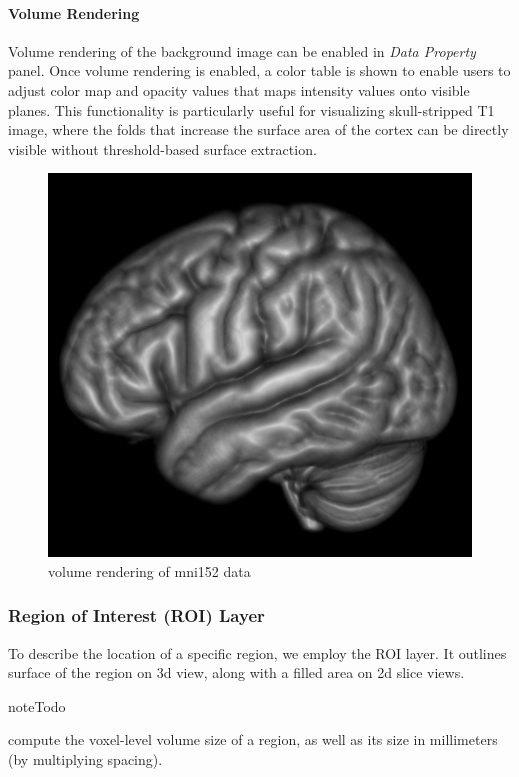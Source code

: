 \documentclass[letterpaper,10pt,english]{sphinxmanual}
\begin{document}
\paragraph{Volume Rendering}
\label{visualization:volume-rendering}
Volume rendering of the background image can be enabled in \emph{Data Property} panel.
Once volume rendering is enabled, a color table is shown to enable users to adjust
color map and opacity values that maps intensity values onto visible planes.
This functionality is particularly useful for visualizing skull-stripped T1 image,
where the folds that increase the surface area of the cortex can be
directly visible without threshold-based surface extraction.
\begin{figure}[htbp]
\centering
\capstart

\includegraphics{volrender.png}
\caption{volume rendering of mni152 data}\end{figure}


\subsubsection{Region of Interest (ROI) Layer}
\label{visualization:region-of-interest-roi-layer}
To describe the location of a specific region, we employ the ROI layer.
It outlines surface of the region on 3d view, along with a filled area on 2d slice views.

\begin{notice}{note}{Todo}

compute the voxel-level volume size of a region, as well as its size in millimeters
(by multiplying spacing).
\end{notice}
\end{document}
